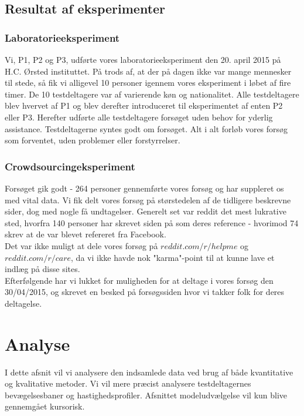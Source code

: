 \section*{Resultat af eksperimenter}

\subsection*{Laboratorieeksperiment}
Vi, P1, P2 og P3, udførte vores laboratorieeksperiment den 20. april 2015 på H.C. Ørsted instituttet. På trods af, at der på dagen ikke var mange mennesker til stede, så fik vi alligevel 10 personer igennem vores eksperiment i løbet af fire timer. De 10 testdeltagere var af varierende køn og nationalitet. Alle testdeltagere blev hvervet af P1 og blev derefter introduceret til eksperimentet af enten P2 eller P3. Herefter udførte alle testdeltagere forsøget uden behov for yderlig assistance. Testdeltagerne syntes godt om forsøget. Alt i alt forløb vores forsøg som forventet, uden problemer eller forstyrrelser.

\subsection*{Crowdsourcingeksperiment}
Forsøget gik godt - 264 personer gennemførte vores forsøg og har suppleret os med vital data. Vi fik delt vores forsøg på størstedelen af de tidligere beskrevne sider, dog med nogle få undtagelser. Generelt set var reddit det mest lukrative sted, hvorfra 140 personer har skrevet siden på som deres reference - hvorimod 74 skrev at de var blevet refereret fra Facebook.\\
Det var ikke muligt at dele vores forsøg på $reddit.com/r/helpme$ og $reddit.com/r/care$, da vi ikke havde nok "karma"-point til at kunne lave et indlæg på disse sites.\\
Efterfølgende har vi lukket for muligheden for at deltage i vores forsøg den 30/04/2015, og skrevet en besked på forsøgssiden hvor vi takker folk for deres deltagelse.

\chapter*{Analyse}
I dette afsnit vil vi analysere den indsamlede data ved brug af både kvantitative og kvalitative metoder. Vi vil mere præcist analysere testdeltagernes bevægelsesbaner og hastighedsprofiler. Afsnittet modeludvælgelse vil kun blive gennemgået kursorisk.

